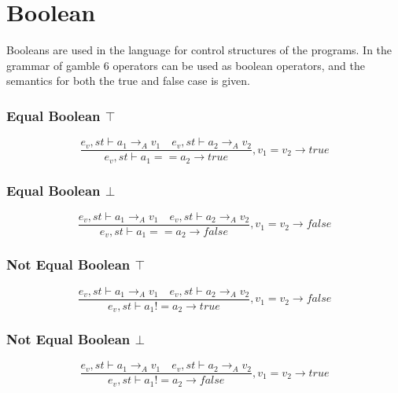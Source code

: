 \section*{Boolean}
Booleans are used in the language for control structures of the programs. 
In the grammar of \gls{gamble} 6 operators can be used as boolean operators, and the semantics for both the true and false case is given.

\subsubsection{Equal Boolean $\top$}
\begin{equation}
	\frac { { e }_{ v },st\vdash { a }_{ 1 }{ \rightarrow  }_{ A }{ v }_{ 1 }\quad { e }_{ v },st\vdash { a }_{ 2 }{ \rightarrow  }_{ A }{ v }_{ 2 } }{ { e }_{ v },st\vdash { a }_{ 1 }=={ a }_{ 2 }{ \rightarrow  }true } ,{ v }_{ 1 }={ v }_{ 2 }\rightarrow true
\end{equation}

\subsubsection{Equal Boolean $\bot$}
\begin{equation}
	\frac { { e }_{ v },st\vdash { a }_{ 1 }{ \rightarrow  }_{ A }{ v }_{ 1 }\quad { e }_{ v },st\vdash { a }_{ 2 }{ \rightarrow  }_{ A }{ v }_{ 2 } }{ { e }_{ v },st\vdash { a }_{ 1 }=={ a }_{ 2 }{ \rightarrow  }false } ,{ v }_{ 1 }={ v }_{ 2 }\rightarrow false
\end{equation}

\subsubsection{Not Equal Boolean $\top$}
\begin{equation}
	\frac { { e }_{ v },st\vdash { a }_{ 1 }{ \rightarrow  }_{ A }{ v }_{ 1 }\quad { e }_{ v },st\vdash { a }_{ 2 }{ \rightarrow  }_{ A }{ v }_{ 2 } }{ { e }_{ v },st\vdash { a }_{ 1 }!={ a }_{ 2 }{ \rightarrow  }true } ,{ v }_{ 1 }={ v }_{ 2 }\rightarrow false
\end{equation}

\subsubsection{Not Equal Boolean $\bot$}
\begin{equation}
	\frac { { e }_{ v },st\vdash { a }_{ 1 }{ \rightarrow  }_{ A }{ v }_{ 1 }\quad { e }_{ v },st\vdash { a }_{ 2 }{ \rightarrow  }_{ A }{ v }_{ 2 } }{ { e }_{ v },st\vdash { a }_{ 1 }!={ a }_{ 2 }{ \rightarrow  }false } ,{ v }_{ 1 }={ v }_{ 2 }\rightarrow true
\end{equation}

